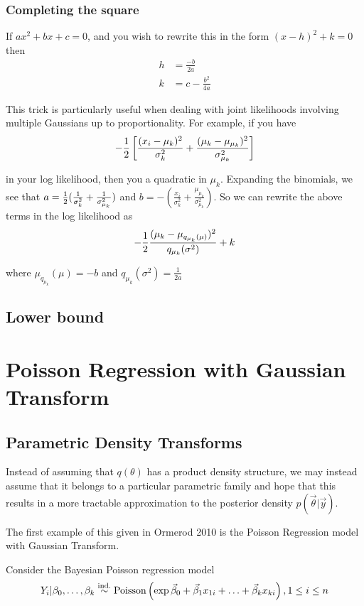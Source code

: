 \documentclass{amsart}
\begin{document}
\subsubsection{Completing the square}
If $ax^2 + bx + c = 0$, and you wish to rewrite this in the form $(x - h)^2 + k = 0$ then
\begin{align*}
h &= \frac{-b}{2a} \\
k &= c - \frac{b^2}{4a}
\end{align*}

This trick is particularly useful when dealing with joint likelihoods involving multiple
Gaussians up to proportionality. For example, if you have
\[
-\frac{1}{2} \left [ \frac{(x_i - \mu_k)^2}{\sigma_k^2} + \frac{(\mu_k - \mu_{\mu_k})^2}{\sigma_{\mu_k}^2} \right ]
\]

in your log likelihood, then you a quadratic in $\mu_k$. Expanding the binomials, we
see that $a = \frac{1}{2} (\frac{1}{\sigma_k^2} + \frac{1}{\sigma_{\mu_k}^2})$ and
$b = -\left( \frac{x_i}{\sigma_k^2} + \frac{\mu_{\mu_k}}{\sigma_{\mu_k}^2} \right)$. So we
can rewrite the above terms in the log likelihood as
\[
-\frac{1}{2} \frac{(\mu_k - \mu_{q_{\mu_k}(\mu)})^2}{q_{\mu_k}(\sigma^2)} + k
\]

where $\mu_{q_{\mu_k}}(\mu) = -b$ and $q_{\mu_k}(\sigma^2) = \frac{1}{2a}$
\subsection{Lower bound}

\section{Poisson Regression with Gaussian Transform}
\subsection{Parametric Density Transforms}
Instead of assuming that $q(\theta)$ has a product density structure, we may instead assume
that it belongs to a particular parametric family and hope that this results in a more
tractable approximation to the posterior density $p(\vec{\theta}|\vec{y})$.

The first example of this given in Ormerod 2010
is the Poisson Regression model with Gaussian Transform.

Consider the Bayesian Poisson regression model
\[
Y_i | \beta_0, \ldots, \beta_k \overset{\text{ind.}}{\sim}  \text{Poisson} \left( \exp{\vec{\beta}_0 + \vec{\beta}_1 x_{1i} + \ldots + \vec{\beta}_k x_{ki}} \right), 1 \leq i \leq n
\]
\end{document}
